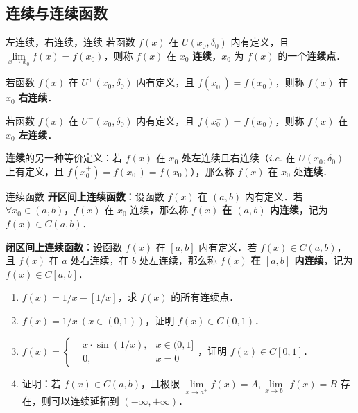 

\subsection{连续与连续函数}

\begin{definition}{左连续，右连续，连续}
  若函数 $f(x)$ 在 $U(x_0,\delta_0)$ 内有定义，且 $\lim\limits_{x\rightarrow x_0}f(x)=f(x_0)$，则称 $f(x)$ 在 $x_0$ \textbf{连续}，$x_0$ 为 $f(x)$ 的一个\textbf{连续点}．

  若函数 $f(x)$ 在 $U^+(x_0,\delta_0)$ 内有定义，且 $f(x_0^+)=f(x_0)$，则称 $f(x)$ 在 $x_0$ \textbf{右连续}．

  若函数 $f(x)$ 在 $U^-(x_0,\delta_0)$ 内有定义，且 $f(x_0^-)=f(x_0)$，则称 $f(x)$ 在 $x_0$ \textbf{左连续}．
\end{definition}

  \textbf{连续}的另一种等价定义：若 $f(x)$ 在 $x_0$ 处左连续且右连续（$i.e. $ 在 $U(x_0,\delta_0)$ 上有定义，且 $f(x_0^+)=f(x_0^-)=f(x_0)$），那么称 $f(x)$ 在 $x_0$ 处\textbf{连续}．

\begin{exercise}{连续函数}
\textbf{开区间上连续函数}：设函数 $f(x)$ 在 $(a,b)$ 内有定义．若 $\forall x_0\in(a,b)$，$f(x)$ 在 $x_0$ 连续，那么称 $f(x)$ \textbf{在 $(a,b)$ 内连续}，记为 $f(x)\in C(a,b)$．

\textbf{闭区间上连续函数}：设函数 $f(x)$ 在 $[a,b]$ 内有定义．若 $f(x)\in C(a,b)$，且 $f(x)$ 在 $a$ 处右连续，在 $b$ 处左连续，那么称 $f(x)$ \textbf{在 $[a,b]$ 内连续}，记为 $f(x)\in C[a,b]$．
\end{exercise}

\begin{exercise}{}
\begin{enumerate}
\item $f(x)=1/x-[1/x]$，求 $f(x)$ 的所有连续点．
\item $f(x)=1/x\ (x\in(0,1))$，证明 $f(x)\in C(0,1)$．
\item $f(x)=\left\{\begin{aligned}&x\cdot \sin(1/x),&x\in(0,1]\\&0,&x=0 \end{aligned}\right.$，证明 $f(x)\in C[0,1]$．
\item 证明：若 $f(x)\in C(a,b)$，且极限 $\lim\limits_{x\rightarrow a^+}f(x)=A,\lim\limits_{x\rightarrow b^-}f(x)=B$ 存在，则可以连续延拓到 $(-\infty,+\infty)$．
\end{enumerate}
\end{exercise}


